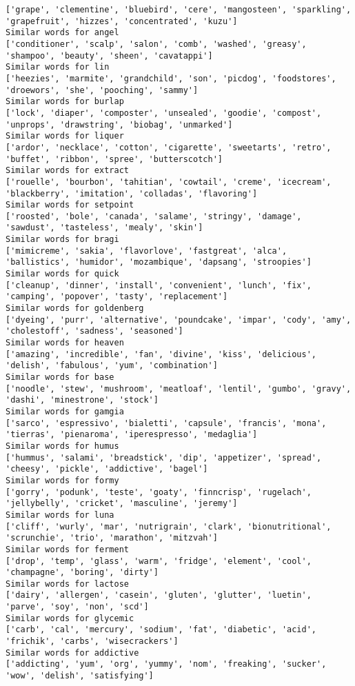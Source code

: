 \documentclass[11pt]{article}
\begin{document}
\begin{Verbatim}[commandchars=\\\{\}]
['grape', 'clementine', 'bluebird', 'cere', 'mangosteen', 'sparkling', 'grapefruit', 'hizzes', 'concentrated', 'kuzu']
Similar words for angel
['conditioner', 'scalp', 'salon', 'comb', 'washed', 'greasy', 'shampoo', 'beauty', 'sheen', 'cavatappi']
Similar words for lin
['heezies', 'marmite', 'grandchild', 'son', 'picdog', 'foodstores', 'droewors', 'she', 'pooching', 'sammy']
Similar words for burlap
['lock', 'diaper', 'composter', 'unsealed', 'goodie', 'compost', 'unprops', 'drawstring', 'biobag', 'unmarked']
Similar words for liquer
['ardor', 'necklace', 'cotton', 'cigarette', 'sweetarts', 'retro', 'buffet', 'ribbon', 'spree', 'butterscotch']
Similar words for extract
['rouelle', 'bourbon', 'tahitian', 'cowtail', 'creme', 'icecream', 'blackberry', 'imitation', 'colladas', 'flavoring']
Similar words for setpoint
['roosted', 'bole', 'canada', 'salame', 'stringy', 'damage', 'sawdust', 'tasteless', 'mealy', 'skin']
Similar words for bragi
['mimicreme', 'sakia', 'flavorlove', 'fastgreat', 'alca', 'ballistics', 'humidor', 'mozambique', 'dapsang', 'stroopies']
Similar words for quick
['cleanup', 'dinner', 'install', 'convenient', 'lunch', 'fix', 'camping', 'popover', 'tasty', 'replacement']
Similar words for goldenberg
['dyeing', 'purr', 'alternative', 'poundcake', 'impar', 'cody', 'amy', 'cholestoff', 'sadness', 'seasoned']
Similar words for heaven
['amazing', 'incredible', 'fan', 'divine', 'kiss', 'delicious', 'delish', 'fabulous', 'yum', 'combination']
Similar words for base
['noodle', 'stew', 'mushroom', 'meatloaf', 'lentil', 'gumbo', 'gravy', 'dashi', 'minestrone', 'stock']
Similar words for gamgia
['sarco', 'espressivo', 'bialetti', 'capsule', 'francis', 'mona', 'tierras', 'pienaroma', 'iperespresso', 'medaglia']
Similar words for humus
['hummus', 'salami', 'breadstick', 'dip', 'appetizer', 'spread', 'cheesy', 'pickle', 'addictive', 'bagel']
Similar words for formy
['gorry', 'podunk', 'teste', 'goaty', 'finncrisp', 'rugelach', 'jellybelly', 'cricket', 'masculine', 'jeremy']
Similar words for luna
['cliff', 'wurly', 'mar', 'nutrigrain', 'clark', 'bionutritional', 'scrunchie', 'trio', 'marathon', 'mitzvah']
Similar words for ferment
['drop', 'temp', 'glass', 'warm', 'fridge', 'element', 'cool', 'champagne', 'boring', 'dirty']
Similar words for lactose
['dairy', 'allergen', 'casein', 'gluten', 'glutter', 'luetin', 'parve', 'soy', 'non', 'scd']
Similar words for glycemic
['carb', 'cal', 'mercury', 'sodium', 'fat', 'diabetic', 'acid', 'frichik', 'carbs', 'wisecrackers']
Similar words for addictive
['addicting', 'yum', 'org', 'yummy', 'nom', 'freaking', 'sucker', 'wow', 'delish', 'satisfying']

\end{Verbatim}
\end{document}
